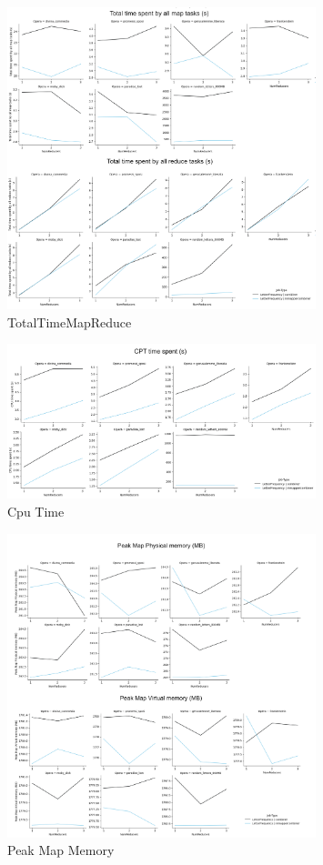 \documentclass[a4paper, 12pt]{article}
\begin{document}
\begin{figure}[H]
  \centering
  \includegraphics[width=0.8\textwidth]{media/performance/TotalTimeMapReduce.png}
  \caption{TotalTimeMapReduce}
  \label{fig:TotalTimeMapReduce}
\end{figure}

\begin{figure}[H]
  \centering
  \includegraphics[width=0.8\textwidth]{media/performance/CpuTIME.png}
  \caption{Cpu Time}
  \label{fig:CpuTIME}
\end{figure}

\begin{figure}[H]
  \centering
  \includegraphics[width=0.8\textwidth]{media/performance/PeakMapMemory.png}
  \caption{Peak Map Memory}
  \label{fig:PeakMapMemory}
\end{figure}
\end{document}
